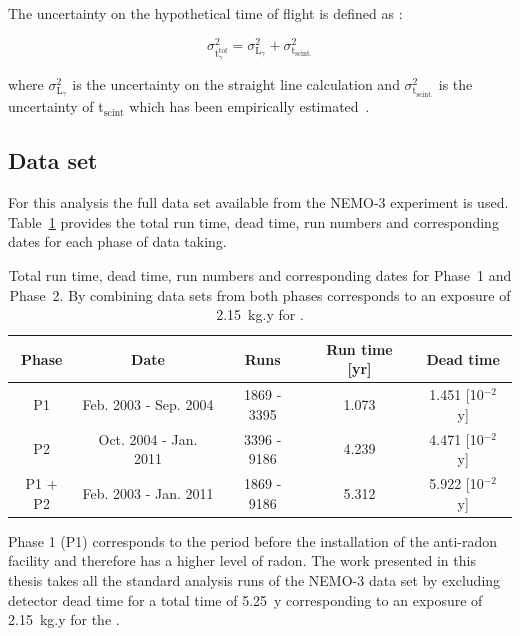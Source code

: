 \documentclass[main.tex]{subfiles}
\begin{document}
\bigskip


\NI The uncertainty on the hypothetical time of flight is defined as :  


\begin{equation}
\sigma^\text{2}_{\text{t}_\gamma^{\text{tof}}} = \sigma^\text{2}_{\text{L}_\gamma} + \sigma^\text{2}_{\text{t}_{\text{scint.}}}
\end{equation}


\bigskip


\NI where $\sigma^\text{2}_{\text{L}_\gamma}$ is the uncertainty on the straight line calculation and $\sigma^\text{2}_{\text{t}_{\text{scint.}}}$ is the uncertainty of t$_{\text{scint}}$ which has been empirically estimated~\cite{GammaReconstructionHereward}.


\FloatBarrier


\subsection{Data set}


\NI For this analysis the full data set available from the NEMO-3 experiment is used. Table~\ref{Tab:RunTimeNEMO3} provides the total run time, dead time, run numbers and corresponding dates for each phase of data taking.


\begin{table}[h!]
\centering
\begin{tabular}{c|c|c|c|c}
Phase   & Date                  & Runs        & Run time [yr] & Dead time  \\
\toprule
P1      & Feb. 2003 - Sep. 2004 & 1869 - 3395 & 1.073         & 1.451  [10$^{-\text{2}}$ y]  \\
P2      & Oct. 2004 - Jan. 2011 & 3396 - 9186 & 4.239         & 4.471  [10$^{-\text{2}}$ y]  \\
P1 + P2 & Feb. 2003 - Jan. 2011 & 1869 - 9186 & 5.312         & 5.922  [10$^{-\text{2}}$ y]  \\
\bottomrule
\end{tabular}
\caption{Total run time, dead time, run numbers and corresponding dates for Phase~1 and Phase~2. By combining data sets from both phases corresponds to an exposure of 2.15~kg.y for \Cd.}
\label{Tab:RunTimeNEMO3}
\end{table} 


\NI Phase 1 (P1) corresponds to the period before the installation of the anti-radon facility and therefore has a higher level of radon. The work presented in this thesis takes all the standard analysis runs of the NEMO-3 data set by excluding detector dead time for a total time of 5.25~y corresponding to an exposure of 2.15~kg.y for the \Cd .
\end{document}
